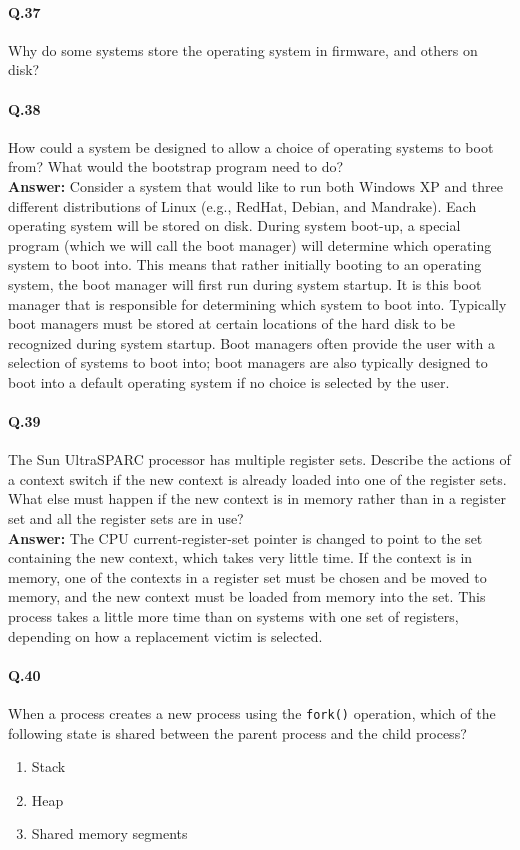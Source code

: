 \documentclass[a4paper,10pt]{article}
\begin{document}
\paragraph{Q.37}
Why do some systems store the operating system in firmware, and others
on disk?

\paragraph{Q.38}
How could a system be designed to allow a choice of operating systems
to boot from? What would the bootstrap program need to do? \\
\textbf{Answer:} Consider a system that would like to run both Windows
XP and three different distributions of Linux (e.g., RedHat, Debian, and
Mandrake). Each operating system will be stored on disk. During system
boot-up, a special program (which we will call the boot manager) will
determine which operating system to boot into. This means that rather
initially booting to an operating system, the boot manager will first run
during system startup. It is this boot manager that is responsible for
determining which system to boot into. Typically boot managers must
be stored at certain locations of the hard disk to be recognized during
system startup. Boot managers often provide the user with a selection of
systems to boot into; boot managers are also typically designed to boot
into a default operating system if no choice is selected by the user.

\paragraph{Q.39}
The Sun UltraSPARC processor has multiple register sets. Describe the
actions of a context switch if the new context is already loaded into
one of the register sets. What else must happen if the new context is in
memory rather than in a register set and all the register sets are in use?\\
\textbf{Answer:} The CPU current-register-set pointer is changed to point to the
set containing the new context, which takes very little time. If the context
is in memory, one of the contexts in a register set must be chosen and be
moved to memory, and the new context must be loaded from memory into the set.
This process takes a little more time than on systems with
one set of registers, depending on how a replacement victim is selected.

\paragraph{Q.40}
When a process creates a new process using the \texttt{fork()} operation,
which of the following state is shared between the parent process and the child
process?
\begin{enumerate}
   \item  Stack
 \item Heap
\item Shared memory segments
 
\end{enumerate}
\end{document}
